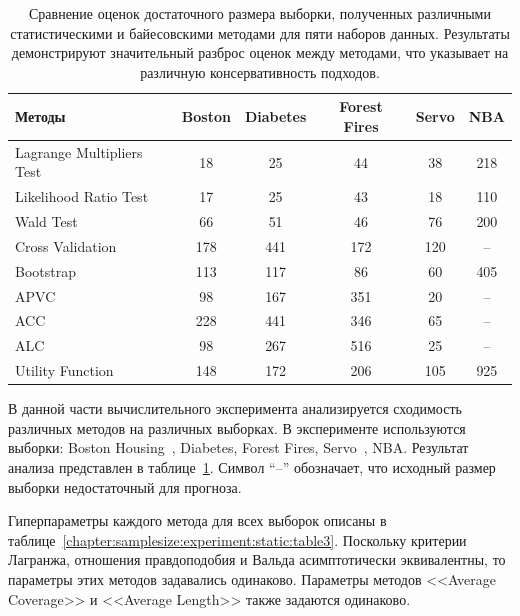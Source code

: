 \begin{table}[h!t]
\centering
\caption{Сравнение оценок достаточного размера выборки, полученных различными статистическими и байесовскими методами для пяти наборов данных. Результаты демонстрируют значительный разброс оценок между методами, что указывает на различную консервативность подходов.}
\label{chapter:samplesize:experiment:static:table2}
\begin{tabular}{|l|c|c|c|c|c|}
\hline
Методы                       & Boston & Diabetes & Forest Fires & Servo & NBA \\ \hline\hline
Lagrange Multipliers Test & 18             & 25       & 44          & 38    & 218 \\ \hline
Likelihood Ratio Test     & 17             & 25       & 43          & 18    & 110 \\ \hline
Wald Test                 & 66             & 51       & 46          & 76    & 200 \\ \hline
Cross Validation          & 178            & 441      & 172         & 120   & --   \\ \hline
Bootstrap                 & 113            & 117      & 86          & 60    & 405 \\ \hline
APVC                      & 98             & 167      & 351         & 20    & --   \\ \hline
ACC                       & 228            & 441      & 346         & 65    & --   \\ \hline
ALC                       & 98             & 267      & 516         & 25    & --   \\ \hline
Utility Function          & 148            & 172      & 206         & 105   & 925 \\ \hline
\end{tabular}
\end{table}

В данной части вычислительного эксперимента анализируется сходимость различных методов на различных выборках. В эксперименте используются выборки: Boston Housing~\cite{boston1978}, Diabetes, Forest Fires, Servo~\cite{servo1992}, NBA.
Результат анализа представлен в таблице~\ref{chapter:samplesize:experiment:static:table2}. Символ ``--'' обозначает, что исходный размер выборки недостаточный для прогноза.

Гиперпараметры каждого метода для всех выборок описаны в таблице~\ref{chapter:samplesize:experiment:static:table3}. Поскольку критерии Лагранжа, отношения правдоподобия и Вальда асимптотически эквивалентны, то параметры этих методов задавались одинаково. Параметры методов <<Average Coverage>> и <<Average Length>> также задаются одинаково.

